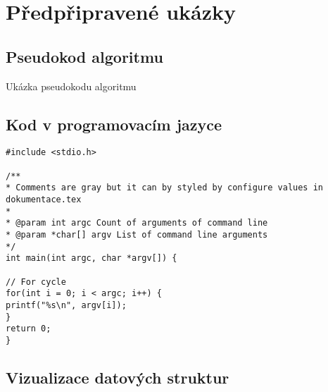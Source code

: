 \section{Předpřipravené ukázky}

\subsection{Pseudokod algoritmu}

\begin{algorithm}[h]
    \caption{Ukázka pseudokodu algoritmu}
\end{algorithm}

\subsection{Kod v programovacím jazyce}

\begin{lstlisting}[caption = Print arguments of command line]
#include <stdio.h>

/**
* Comments are gray but it can by styled by configure values in dokumentace.tex
*
* @param int argc Count of arguments of command line
* @param *char[] argv List of command line arguments
*/
int main(int argc, char *argv[]) {

// For cycle
for(int i = 0; i < argc; i++) {
printf("%s\n", argv[i]);
}
return 0;
}
\end{lstlisting}
\subsection{Vizualizace datových struktur}
